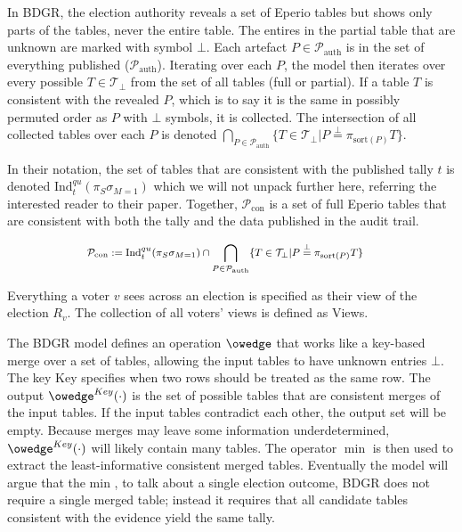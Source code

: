 
In BDGR, the election authority reveals a set of Eperio tables but shows only parts of the tables, never the entire table. The entires in the partial table that are unknown are marked with symbol $\bot$. Each artefact $P\in \mathcal{P}_{\mathrm{auth}}$ is in the set of everything published ($\mathcal{P}_{\mathrm{auth}}$). Iterating over each $P$, the model then iterates over every possible $T \in \mathcal{T}_\bot$ from the set of all tables (full or partial). If a table $T$ is consistent with the revealed $P$, which is to say it is the same in possibly permuted order as $P$ with $\bot$ symbols, it is collected. The intersection of all collected tables over each $P$ is denoted $\bigcap_{P\in \mathcal{P}_{\mathrm{auth}}}\{T\in\mathcal{T}_\bot|P\stackrel{\bot}{=}\pi_{\mathrm{sort}(P)}T\}$. 

In their notation, the set of tables that are consistent with the published tally $t$ is denoted $\mathrm{Ind}^{qu}_t(\pi_S\sigma_{M=1})$ which we will not unpack further here, referring the interested reader to their paper. Together, $\mathcal{P}_{\mathrm{con}}$ is a set of full Eperio tables that are consistent with both the tally and the data published in the audit trail. 

\begin{mdframed}[linewidth=0.6pt,backgroundcolor=verylightblue,innerleftmargin=6pt,innerrightmargin=6pt,innertopmargin=4pt,innerbottommargin=4pt]
\[
\footnotesize
\begin{aligned}
\mathcal{P}_{\mathrm{con}}&:=\mathrm{Ind}^{qu}_t(\pi_S\sigma_{M=1}) \cap \bigcap_{P\in \mathcal{P}_{\mathrm{auth}}}\{T\in\mathcal{T}_\bot|P\stackrel{\bot}{=}\pi_{\mathrm{sort}(P)}T\}
\end{aligned}
\]
\end{mdframed}

Everything a voter $v$ sees across an election is specified as their view of the election $R_v$. The collection of all voters' views is defined as Views.

The BDGR model defines an operation $\owedge$ that works like a key-based merge over a set of tables, allowing the input tables to have unknown entries $\bot$. The key Key specifies when two rows should be treated as the same row. The output $\owedge^{Key}(\cdot)$ is the set of possible tables that are consistent merges of the input tables. If the input tables contradict each other, the output set will be empty. Because merges may leave some information underdetermined, $\owedge^{Key}(\cdot)$ will likely contain many tables. The operator $\min$ is then used to extract the least-informative consistent merged tables. Eventually the model will argue that the min , to talk about a single election outcome, BDGR does not require a single merged table; instead it requires that all candidate tables consistent with the evidence yield the same tally.

